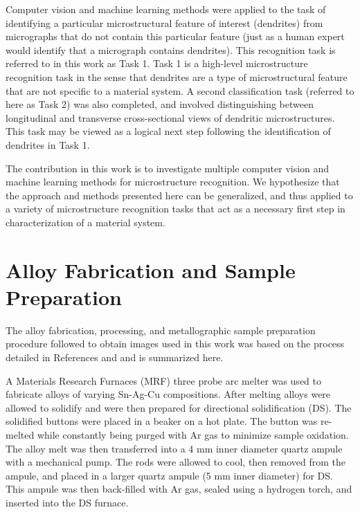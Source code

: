 Computer vision and machine learning methods were applied to the task of identifying a particular microstructural feature of interest (dendrites) from micrographs that do not contain this particular feature (just as a human expert would identify that a micrograph contains dendrites).  This recognition task is referred to in this work as Task 1.  Task 1 is a high-level microstructure recognition task in the sense that dendrites are a type of microstructural feature that are not specific to a material system.  A second classification task (referred to here as Task 2) was also completed, and involved distinguishing between longitudinal and transverse cross-sectional views of dendritic microstructures. This task may be viewed as a logical next step following the identification of dendrites in Task 1.

The contribution in this work is to investigate multiple computer vision and machine learning methods for microstructure recognition. We hypothesize that the approach and methods presented here can be generalized, and thus applied to a variety of microstructure recognition tasks that act as a necessary first step in characterization of a material system.

\section{Alloy Fabrication and Sample Preparation}
\label{sample_prep}

The alloy fabrication, processing, and metallographic sample preparation procedure followed to obtain images used in this work was based on the process detailed in References \cite{Schaefer2005} and \cite{Mao2014} and is summarized here. 
%

A Materials Research Furnaces (MRF) three probe arc melter was used to fabricate alloys of varying Sn-Ag-Cu compositions.  After melting alloys were allowed to solidify and were then prepared for directional solidification (DS).  The solidified buttons were placed in a beaker on a hot plate.  The button was re-melted while constantly being purged with Ar gas to minimize sample oxidation. The alloy melt was then transferred into a 4 mm inner diameter quartz ampule with a mechanical pump.  The rods were allowed to cool, then removed from the ampule, and placed in a larger quartz ampule (5 mm inner diameter) for DS.  This ampule was then back-filled with Ar gas, sealed using a hydrogen torch, and inserted into the DS furnace.

